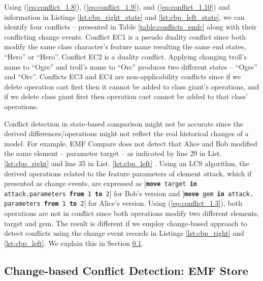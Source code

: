 Using (\ref{eq:conflict_1.8}), (\ref{eq:conflict_1.9}), and (\ref{eq:conflict_1.10}) and information in Listings \ref{lst:cbp_right_state} and \ref{lst:cbp_left_state}, we can identify four conflicts -- presented in Table \ref{table:conflicts_emfc} along with their conflicting change events. Conflict \textsf{EC1} is a pseudo duality conflict since both modify the same class \textsf{character}'s feature \textsf{name} resulting the same end states, ``Hero'' or ``Hero''. Conflict \textsf{EC2} is a duality conflict. Applying changing \textsf{troll}'s \textsf{name} to ``Ogre'' and \textsf{troll}'s \textsf{name} to ``Orc'' produces two different states -- ``Ogre'' and ``Orc''. Conflicts \textsf{EC3} and \textsf{EC4} are non-applicability conflicts since if we delete operation \textsf{cast} first then it cannot be added to class \textsf{giant}'s operations, and if we delete class \textsf{giant} first then operation \textsf{cast} cannot be added to that class' operations.

Conflict detection in state-based comparison might not be accurate since the derived differences/operations might not reflect the real historical changes of a model.
For example, EMF Compare does not detect that Alice and Bob modified the same element -- parameter \textsf{target} -- as indicated by line 29 in List. \ref{lst:cbp_right} and line 35 in List. \ref{lst:cbp_left} . Using an LCS algorithm, the derived operations related to the feature \textsf{parameters} of element \textsf{attack}, which if presented as change events, are expressed as [\texttt{\small \textbf{move} target \textbf{in} attack.parameters \textbf{from} 1 \textbf{to} 2}] for Bob's version and [\texttt{\small \textbf{move} gem \textbf{in} attack. parameters \textbf{from} 1 \textbf{to} 2}] for Alice's version. Using (\ref{eq:conflict_1.3}), both operations are not in conflict since both operations modify two different elements, \textsf{target} and \textsf{gem}. The result is different if we employ change-based approach to detect conflicts using the change event records in Listings \ref{lst:cbp_right} and \ref{lst:cbp_left}. We explain this in Section \ref{sec:change_based_conflict_detection_emf_store}.

\subsection{Change-based Conflict Detection: EMF Store}
\label{sec:change_based_conflict_detection_emf_store}

